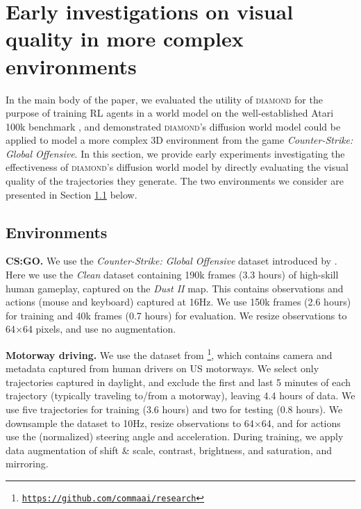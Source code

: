 \section{Early investigations on visual quality in more complex environments}
\label{app:additonal_experiments}

In the main body of the paper, we evaluated the utility of \textsc{diamond} for the purpose of training RL agents in a world model on the well-established Atari 100k benchmark \citep{kaiser2019atari100k}, and demonstrated \textsc{diamond}'s diffusion world model could be applied to model a more complex 3D environment from the game \textit{Counter-Strike: Global Offensive}. In this section, we provide early experiments investigating the effectiveness of \textsc{diamond}'s diffusion world model by directly evaluating the visual quality of the trajectories they generate. The two environments we consider are presented in Section \ref{app:subsec:environments} below.

\subsection{Environments}
\label{app:subsec:environments}

\textbf{CS:GO.} 
We use the \textit{Counter-Strike: Global Offensive} dataset introduced by \citet{pearce2022counter}. Here we use the \textit{Clean} dataset containing 190k frames (3.3 hours) of high-skill human gameplay, captured on the \textit{Dust II} map. This contains observations and actions (mouse and keyboard) captured at 16Hz. We use 150k frames (2.6 hours) for training and 40k frames (0.7 hours) for evaluation. We resize observations to 64$\times$64 pixels, and use no augmentation.

\textbf{Motorway driving.} We use the dataset from \citet{santana2016learning}\footnote{\href{https://github.com/commaai/research}{\texttt{https://github.com/commaai/research}}}, which contains camera and metadata captured from human drivers on US motorways. We select only trajectories captured in daylight, and exclude the first and last 5 minutes of each trajectory (typically traveling to/from a motorway), leaving 4.4 hours of data. We use five trajectories for training (3.6 hours) and two for testing (0.8 hours). We downsample the dataset to 10Hz, resize observations to 64$\times$64, and for actions use the (normalized) steering angle and acceleration. During training, we apply data augmentation of shift \& scale, contrast, brightness, and saturation, and mirroring.

